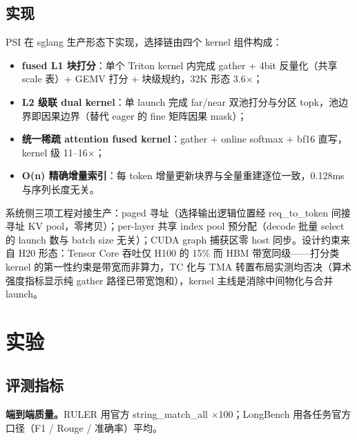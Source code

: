\documentclass[11pt]{article}
\begin{document}
\subsection{实现}

PSI 在 sglang 生产形态下实现，选择链由四个 kernel 组件构成：
\begin{itemize}
\item \textbf{fused L1 块打分}：单个 Triton kernel 内完成 gather + 4bit 反量化（共享 scale 表）+ GEMV 打分 + 块级规约，32K 形态 3.6$\times$；
\item \textbf{L2 级联 dual kernel}：单 launch 完成 far/near 双池打分与分区 topk，池边界即因果边界（替代 eager 的 fine 矩阵因果 mask）；
\item \textbf{统一稀疏 attention fused kernel}：gather + online softmax + bf16 直写，kernel 级 11--16$\times$；
\item \textbf{O(n) 精确增量索引}：每 token 增量更新块界与全量重建逐位一致，0.128ms 与序列长度无关。
\end{itemize}
系统侧三项工程对接生产：paged 寻址（选择输出逻辑位置经 req\_to\_token 间接寻址 KV pool，零拷贝）；per-layer 共享 index pool 预分配（decode 批量 select 的 launch 数与 batch size 无关）；CUDA graph 捕获区零 host 同步。设计约束来自 H20 形态：Tensor Core 吞吐仅 H100 的 15\% 而 HBM 带宽同级——打分类 kernel 的第一性约束是带宽而非算力，TC 化与 TMA 转置布局实测均否决（算术强度指标显示纯 gather 路径已带宽饱和），kernel 主线是消除中间物化与合并 launch。

\section{实验}

\subsection{评测指标}

\textbf{端到端质量。}RULER 用官方 string\_match\_all $\times$100；LongBench 用各任务官方口径（F1 / Rouge / 准确率）平均。
\end{document}
